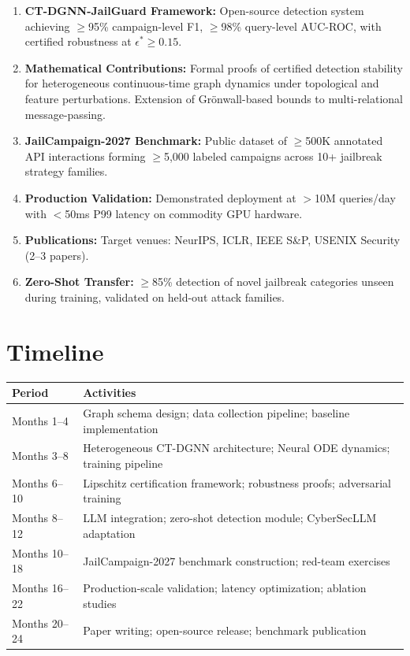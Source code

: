 \documentclass[12pt,a4paper]{article}
\begin{document}
\begin{enumerate}
    \item \textbf{CT-DGNN-JailGuard Framework:} Open-source detection system achieving $\geq$95\% campaign-level F1, $\geq$98\% query-level AUC-ROC, with certified robustness at $\epsilon^* \geq 0.15$.
    
    \item \textbf{Mathematical Contributions:} Formal proofs of certified detection stability for heterogeneous continuous-time graph dynamics under topological and feature perturbations. Extension of Gr\"onwall-based bounds to multi-relational message-passing.
    
    \item \textbf{JailCampaign-2027 Benchmark:} Public dataset of $\geq$500K annotated API interactions forming $\geq$5,000 labeled campaigns across 10+ jailbreak strategy families.
    
    \item \textbf{Production Validation:} Demonstrated deployment at $>$10M queries/day with $<$50ms P99 latency on commodity GPU hardware.
    
    \item \textbf{Publications:} Target venues: NeurIPS, ICLR, IEEE S\&P, USENIX Security (2--3 papers).
    
    \item \textbf{Zero-Shot Transfer:} $\geq$85\% detection of novel jailbreak categories unseen during training, validated on held-out attack families.
\end{enumerate}

\section{Timeline}

\begin{table}[H]
\centering
\begin{tabularx}{\textwidth}{@{}lX@{}}
\toprule
\textbf{Period} & \textbf{Activities} \\
\midrule
Months 1--4 & Graph schema design; data collection pipeline; baseline implementation \\
Months 3--8 & Heterogeneous CT-DGNN architecture; Neural ODE dynamics; training pipeline \\
Months 6--10 & Lipschitz certification framework; robustness proofs; adversarial training \\
Months 8--12 & LLM integration; zero-shot detection module; CyberSecLLM adaptation \\
Months 10--18 & JailCampaign-2027 benchmark construction; red-team exercises \\
Months 16--22 & Production-scale validation; latency optimization; ablation studies \\
Months 20--24 & Paper writing; open-source release; benchmark publication \\
\bottomrule
\end{tabularx}
\end{table}
\end{document}
